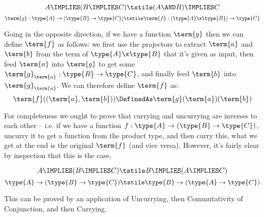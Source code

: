 \begin{Theorem}[Uncurrying]
\[
A \IMPLIES (B \IMPLIES C)
\tstile
(A \AND B) \IMPLIES C 
\]
\[
\term{g}:\type{A} \to (\type{B} \to \type{C})
\tstile
\term{f}:(\type{A} \x \type{B}) \to \type{C}
\]
\end{Theorem}
\begin{Proof}
Going in the opposite direction, if we have a function $\term{g}$ then we can define $\term{f}$ as follows: we first use the projectors to extract $\term{a}$ and $\term{b}$ from the term of $\type{A} \x \type{B}$ that it's given as input, then feed $\term{a}$ into $\term{g}$ to get some $\term{g}_{\term{a}}:\type{B} \to \type{C}$, and finally feed $\term{b}$ into $\term{g}_{\term{a}}$.  We can therefore define $\term{f}$ as:
\[
\term{f}((\term{a},\term{b}))
\DefinedAs 
\term{g}(\term{a})(\term{b}) 
%
\]
\end{Proof}

For completeness we ought to prove that currying and uncurrying are inverses to each other -- i.e. if we have a function $f:\type{A} \to (\type{B} \to \type{C})$, uncurry it to get a function from the product type, and then curry this, what we get at the end is the original $\term{f}$ (and vice versa).  However, it's fairly clear by inspection that this is the case.




\begin{Theorem}
\label{thm:SwapFnInputs}
\[
A \IMPLIES (B \IMPLIES C)
\tstile
B \IMPLIES (A \IMPLIES C)
\]
\[
\type{A} \to (\type{B} \to \type{C})
\tstile
\type{B} \to (\type{A} \to \type{C})
\]
\end{Theorem}
\begin{Proof}
This can be proved by an application of Uncurrying, then Commutativity of Conjunction, and then Currying.
\end{Proof}



